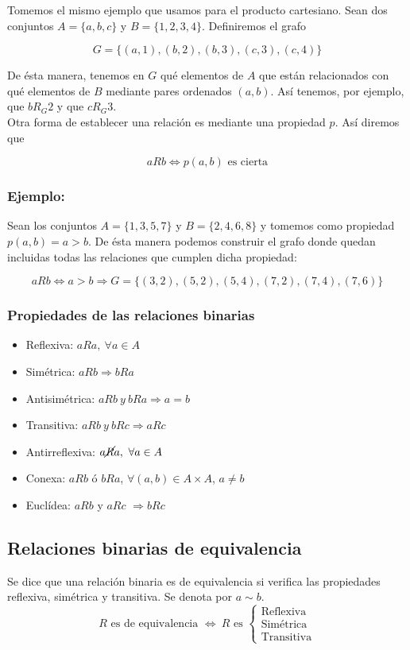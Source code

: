 Tomemos el mismo ejemplo que usamos para el producto cartesiano. Sean dos conjuntos $A=\lbrace a,b,c \rbrace$ y $B=\lbrace 1,2,3,4 \rbrace$. Definiremos el grafo 

$$
G=\lbrace (a,1),(b,2),(b,3),(c,3),(c,4) \rbrace
$$

De ésta manera, tenemos en $G$ qué elementos de $A$ que están relacionados con qué elementos de $B$ mediante pares ordenados $(a,b)$. Así tenemos, por ejemplo, que $bR_G2$ y que $cR_G3$.\\

Otra forma de establecer una relación es mediante una propiedad $p$. Así diremos que

$$
aRb \Leftrightarrow p(a,b) \text{ es cierta}
$$

\subsubsection*{Ejemplo:}

Sean los conjuntos $A=\lbrace 1,3,5,7 \rbrace$ y $B=\lbrace 2,4,6,8 \rbrace$ y tomemos como propiedad $p(a,b)=a>b$. De ésta manera podemos construir el grafo donde quedan incluidas todas las relaciones que cumplen dicha propiedad:

$$
aRb \Leftrightarrow a>b \Rightarrow G=\lbrace(3,2),(5,2),(5,4),(7,2),(7,4),(7,6) \rbrace
$$

\newpage
\subsubsection*{Propiedades de las relaciones binarias}
\begin{itemize}
\item Reflexiva: $aRa,\ \forall a \in A$
\item Simétrica: $aRb \Rightarrow bRa$
\item Antisimétrica: $aRb\ y\ bRa \Rightarrow a=b$
\item Transitiva: $aRb\ y\ bRc \Rightarrow aRc$
\item Antirreflexiva: $a\cancel{R} a,\ \forall a \in A$
\item Conexa: $aRb$ ó $bRa$, $\forall (a,b) \in A\times A$, $a\not = b$
\item Euclídea: $aRb$ y $aRc$ $\Rightarrow bRc$
\end{itemize}

\subsection*{Relaciones binarias de equivalencia}
Se dice que una relación binaria es de equivalencia si verifica las propiedades reflexiva, simétrica y transitiva. Se denota por $a \sim b$.
$$
R \text{ es de equivalencia } \Leftrightarrow \ R \text{ es }
\begin{cases}
\text{Reflexiva}\\
\text{Simétrica}\\
\text{Transitiva}
\end{cases}
$$

